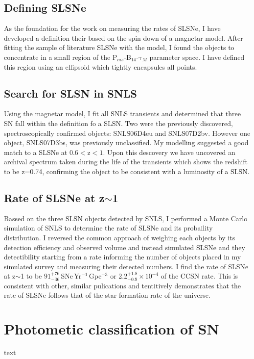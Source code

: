 \subsection{Defining SLSNe}
As the foundation for the work on measuring the rates of SLSNe, I have developed a definition their based on the spin-down of a magnetar model. After fitting the sample of literature SLSNe with the model, I found the objects to concentrate in a small region of the P$_{ms}$-B$_{14}$-$\mathrm{\tau}_M$ parameter space. I have defined this region using an ellipsoid which tightly encapsules all points.

\subsection{Search for SLSN in SNLS}
Using the magnetar model, I fit all SNLS transients and determined that three SN fall within the definition fo a SLSN. Two were the previously discovered, spectroscopically confirmed objects: SNLS06D4eu and SNLS07D2bv. However one object, SNLS07D3bs, was previously unclassified. My modelling suggested a good match to a SLSNe at 0.6$<$z$<1$. Upon this descovery we have uncovered an archival spectrum taken during the life of the transients which shows the redshift to be z=0.74, confirming the object to be consistent with a luminosity of a SLSN.

\subsection{Rate of SLSNe at z$\sim$1}
Bassed on the three SLSN objects detected by SNLS, I performed a Monte Carlo simulation of SNLS to determine the rate of SLSNe and its probaility distribution. I reversed the common approach of weighing each objects by its detection efficiency and observed volume and instead simulated SLSNe and they detectibility starting from a rate informing the number of objects placed in my simulated survey and measuring their detected numbers. I find the rate of SLSNe at z$\sim$1 to be $91^{+76}_{-36}$\,SNe\,Yr$^{-1}$\,Gpc$^{-3}$ or 2.2$^{+1.8}_{-0.9}\times10^{-4}$ of the CCSN rate. This is consistent with other, similar pulications and tentitively demonstrates that the rate of SLSNe follows that of the star formation rate of the universe.

\section{Photometic classification of SN}
text

